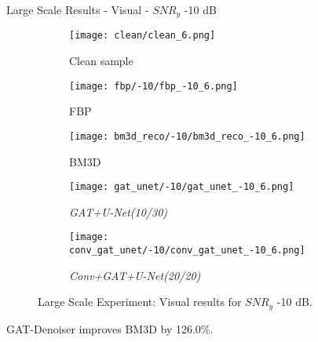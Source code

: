 \begin{frame}{Large Scale Results - Visual - $SNR_y$ -10 dB}
    \begin{figure}
        \captionsetup[subfigure]{justification=centering}
        \centering
        \begin{subfigure}[t]{0.18\textwidth}
          \texttt{[image: clean/clean\_6.png]}
          \caption{Clean sample}
        \end{subfigure} \hfill
        \begin{subfigure}[t]{0.18\textwidth}
          \texttt{[image: fbp/-10/fbp\_-10\_6.png]}
          \caption{FBP}
        \end{subfigure} \hfill
        \begin{subfigure}[t]{0.18\textwidth}
          \texttt{[image: bm3d\_reco/-10/bm3d\_reco\_-10\_6.png]}
          \caption{BM3D}
        \end{subfigure} \hfill
        \begin{subfigure}[t]{0.18\textwidth}
          \texttt{[image: gat\_unet/-10/gat\_unet\_-10\_6.png]}
          \caption{\textit{GAT+U-Net(10/30)}}
        \end{subfigure} \hfill
        \begin{subfigure}[t]{0.18\textwidth}
          \texttt{[image: conv\_gat\_unet/-10/conv\_gat\_unet\_-10\_6.png]}
          \caption{\textit{Conv+GAT+U-Net(20/20)}}
        \end{subfigure} \hfill
        \caption{Large Scale Experiment: Visual results for $SNR_y$ -10 dB.}
      \end{figure}
      
    
      \begin{tcolorbox}[colback=red!5!white,hide=<1>, alert=<2>, colframe=red!75!black]
        GAT-Denoiser improves BM3D by 126.0\%.
        \end{tcolorbox}
        
\end{frame}

